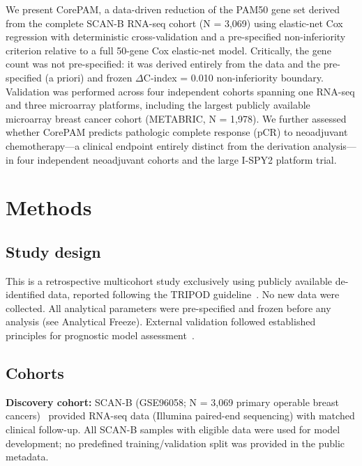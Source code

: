 \documentclass[pdflatex,sn-vancouver-num]{sn-jnl}
\begin{document}
We present CorePAM, a data-driven reduction of the PAM50 gene set derived from the complete SCAN-B RNA-seq cohort (N = 3,069) using elastic-net Cox regression with deterministic cross-validation and a pre-specified non-inferiority criterion relative to a full 50-gene Cox elastic-net model. Critically, the gene count was not pre-specified: it was derived entirely from the data and the pre-specified (a priori) and frozen $\Delta$C-index = 0.010 non-inferiority boundary. Validation was performed across four independent cohorts spanning one RNA-seq and three microarray platforms, including the largest publicly available microarray breast cancer cohort (METABRIC, N = 1,978). We further assessed whether CorePAM predicts pathologic complete response (pCR) to neoadjuvant chemotherapy---a clinical endpoint entirely distinct from the derivation analysis---in four independent neoadjuvant cohorts and the large I-SPY2 platform trial.

\section{Methods}\label{sec:methods}

\subsection{Study design}\label{subsec:study-design}

This is a retrospective multicohort study exclusively using publicly available de-identified data, reported following the TRIPOD guideline~\cite{moons2015}. No new data were collected. All analytical parameters were pre-specified and frozen before any analysis (see Analytical Freeze). External validation followed established principles for prognostic model assessment~\cite{royston2013}.

\subsection{Cohorts}\label{subsec:cohorts}

\textbf{Discovery cohort:} SCAN-B (GSE96058; N = 3,069 primary operable breast cancers)~\cite{brueffer2018,saal2015} provided RNA-seq data (Illumina paired-end sequencing) with matched clinical follow-up. All SCAN-B samples with eligible data were used for model development; no predefined training/validation split was provided in the public metadata.
\end{document}
